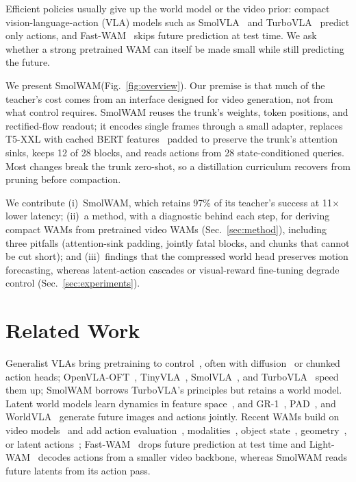 \documentclass{article}
\newcommand{\smol}{SmolWAM\xspace}
\begin{document}
Efficient policies usually give up the world model or the video prior: compact vision-language-action (VLA) models such as SmolVLA~\citep{shukor2025smolvla} and TurboVLA~\citep{xie2026turbovla} predict only actions, and Fast-WAM~\citep{yuan2026fastwam} skips future prediction at test time.
We ask whether a strong pretrained WAM can itself be made small while still predicting the future.

We present \smol (Fig.~\ref{fig:overview}).
Our premise is that much of the teacher's cost comes from an interface designed for video generation, not from what control requires.
\smol reuses the trunk's weights, token positions, and rectified-flow readout; it encodes single frames through a small adapter, replaces T5-XXL with cached BERT features~\citep{devlin2019bert} padded to preserve the trunk's attention sinks, keeps 12 of 28 blocks, and reads actions from 28 state-conditioned queries.
Most changes break the trunk zero-shot, so a distillation curriculum recovers from pruning before compaction.

We contribute (i)~\smol, which retains 97\% of its teacher's success at 11$\times$ lower latency; (ii)~a method, with a diagnostic behind each step, for deriving compact WAMs from pretrained video WAMs (Sec.~\ref{sec:method}), including three pitfalls (attention-sink padding, jointly fatal blocks, and chunks that cannot be cut short); and (iii)~findings that the compressed world head preserves motion forecasting, whereas latent-action cascades or visual-reward fine-tuning degrade control (Sec.~\ref{sec:experiments}).

\section{Related Work}
\label{sec:related}

Generalist VLAs bring pretraining to control~\citep{brohan2023rt2,kim2024openvla,openx2024,octo2024,black2025pi0,pertsch2025fast}, often with diffusion~\citep{chi2023diffusionpolicy} or chunked~\citep{zhao2023act} action heads; OpenVLA-OFT~\citep{kim2025openvlaoft}, TinyVLA~\citep{wen2025tinyvla}, SmolVLA~\citep{shukor2025smolvla}, and TurboVLA~\citep{xie2026turbovla} speed them up; \smol borrows TurboVLA's principles but retains a world model.
Latent world models learn dynamics in feature space~\citep{zhou2025dinowm,assran2025vjepa2,zheng2025flare,maes2026leworldmodel,gao2026fastleworldmodel}, and GR-1~\citep{wu2024gr1}, PAD~\citep{guo2024pad}, and WorldVLA~\citep{cen2025worldvla} generate future images and actions jointly.
Recent WAMs build on video models~\citep{kim2026cosmospolicy,ye2026dreamzero} and add action evaluation~\citep{zhou2026tau0wm}, modalities~\citep{nvidia2026cosmos3}, object state~\citep{liu2026oawam}, geometry~\citep{lopetegui2026sawam}, or latent actions~\citep{chen2026abotm05}; Fast-WAM~\citep{yuan2026fastwam} drops future prediction at test time and Light-WAM~\citep{li2026lightwam} decodes actions from a smaller video backbone, whereas \smol reads future latents from its action pass.
\end{document}
